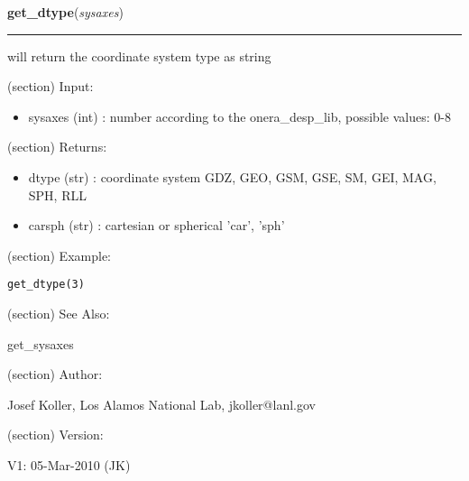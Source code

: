     \label{spacepy:onerapy:get_dtype}

    \vspace{0.5ex}

\hspace{.8\funcindent}\begin{boxedminipage}{\funcwidth}

    \raggedright \textbf{get\_dtype}(\textit{sysaxes})

    \vspace{-1.5ex}

    \rule{\textwidth}{0.5\fboxrule}
\setlength{\parskip}{2ex}
    will return the coordinate system type as string

    (section) Input:

      \begin{itemize}
      \setlength{\parskip}{0.6ex}
        \item sysaxes (int) : number according to the onera\_desp\_lib, 
          possible values: 0-8

      \end{itemize}

    (section) Returns:

      \begin{itemize}
      \setlength{\parskip}{0.6ex}
        \item dtype (str) : coordinate system GDZ, GEO, GSM, GSE, SM, GEI, MAG,
          SPH, RLL

        \item carsph (str) : cartesian or spherical 'car', 'sph'

      \end{itemize}

    (section) Example:

\begin{alltt}
\pysrcprompt{{\textgreater}{\textgreater}{\textgreater} }get\_dtype(3)
\end{alltt}
    (section) See Also:

      get\_sysaxes

    (section) Author:

      Josef Koller, Los Alamos National Lab, jkoller@lanl.gov

    (section) Version:

      V1: 05-Mar-2010 (JK)

\setlength{\parskip}{1ex}
    \end{boxedminipage}

